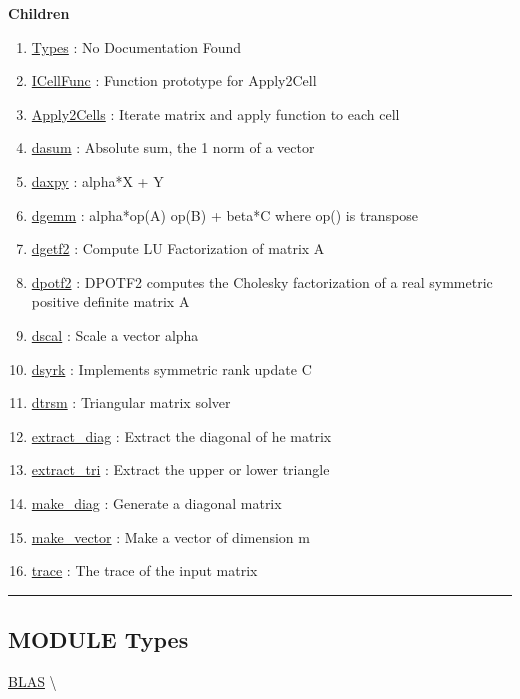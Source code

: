 \textbf{Children}
\begin{enumerate}
\item \hyperlink{ecldoc:BLAS.Types}{Types}
: No Documentation Found
\item \hyperlink{ecldoc:blas.icellfunc}{ICellFunc}
: Function prototype for Apply2Cell
\item \hyperlink{ecldoc:blas.apply2cells}{Apply2Cells}
: Iterate matrix and apply function to each cell
\item \hyperlink{ecldoc:blas.dasum}{dasum}
: Absolute sum, the 1 norm of a vector
\item \hyperlink{ecldoc:blas.daxpy}{daxpy}
: alpha*X + Y
\item \hyperlink{ecldoc:blas.dgemm}{dgemm}
: alpha*op(A) op(B) + beta*C where op() is transpose
\item \hyperlink{ecldoc:blas.dgetf2}{dgetf2}
: Compute LU Factorization of matrix A
\item \hyperlink{ecldoc:blas.dpotf2}{dpotf2}
: DPOTF2 computes the Cholesky factorization of a real symmetric positive definite matrix A
\item \hyperlink{ecldoc:blas.dscal}{dscal}
: Scale a vector alpha
\item \hyperlink{ecldoc:blas.dsyrk}{dsyrk}
: Implements symmetric rank update C 
\item \hyperlink{ecldoc:blas.dtrsm}{dtrsm}
: Triangular matrix solver
\item \hyperlink{ecldoc:blas.extract_diag}{extract\_diag}
: Extract the diagonal of he matrix
\item \hyperlink{ecldoc:blas.extract_tri}{extract\_tri}
: Extract the upper or lower triangle
\item \hyperlink{ecldoc:blas.make_diag}{make\_diag}
: Generate a diagonal matrix
\item \hyperlink{ecldoc:blas.make_vector}{make\_vector}
: Make a vector of dimension m
\item \hyperlink{ecldoc:blas.trace}{trace}
: The trace of the input matrix
\end{enumerate}

\rule{\linewidth}{0.5pt}

\subsection*{\textsf{\colorbox{headtoc}{\color{white} MODULE}
Types}}

\hypertarget{ecldoc:BLAS.Types}{}
\hspace{0pt} \hyperlink{ecldoc:blas}{BLAS} \textbackslash 


